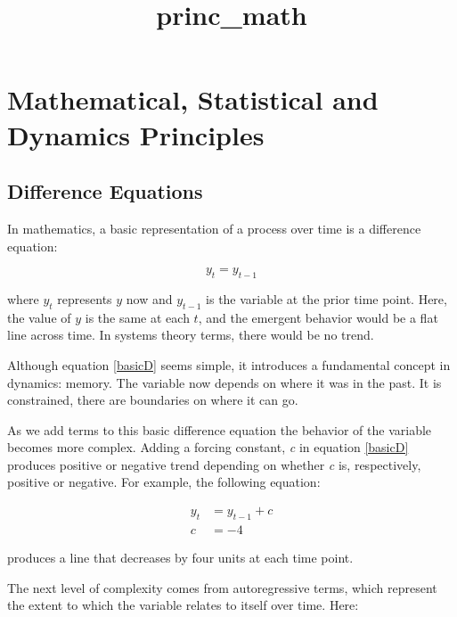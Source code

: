 \documentclass[]{article}
\title{princ\_math}
\author{}
\date{}
\begin{document}
\maketitle

\hypertarget{mathematical-statistical-and-dynamics-principles}{%
\section{Mathematical, Statistical and Dynamics
Principles}\label{mathematical-statistical-and-dynamics-principles}}

\hypertarget{difference-equations}{%
\subsection{Difference Equations}\label{difference-equations}}

In mathematics, a basic representation of a process over time is a
difference equation:

\begin{equation}
\label{basicD}
y_{t} = y_{t - 1}
\end{equation}

\noindent where \(y_{t}\) represents \(y\) now and \(y_{t-1}\) is the
variable at the prior time point. Here, the value of \(y\) is the same
at each \(t\), and the emergent behavior would be a flat line across
time. In systems theory terms, there would be no trend.

Although equation \ref{basicD} seems simple, it introduces a fundamental
concept in dynamics: memory. The variable now depends on where it was in
the past. It is constrained, there are boundaries on where it can go.

As we add terms to this basic difference equation the behavior of the
variable becomes more complex. Adding a forcing constant, \emph{c} in
equation \ref{basicD} produces positive or negative trend depending on
whether \emph{c} is, respectively, positive or negative. For example,
the following equation:

\begin{equation}
\begin{split}
\label{diffC}
y_{t} &= y_{t-1} + c \\ 
c &= -4
\end{split}
\end{equation}

\noindent produces a line that decreases by four units at each time
point.

The next level of complexity comes from autoregressive terms, which
represent the extent to which the variable relates to itself over time.
Here:
\end{document}
